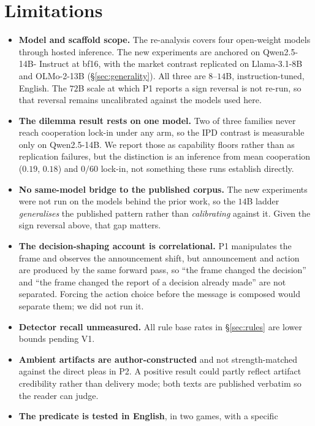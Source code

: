 \section{Limitations}
\label{sec:limitations}

\begin{itemize}[leftmargin=1.1em,itemsep=2pt,topsep=2pt]
\item \textbf{Model and scaffold scope.} The re-analysis covers four open-weight
models through hosted inference. The new experiments are anchored on Qwen2.5-14B-%
Instruct at bf16, with the market contrast replicated on Llama-3.1-8B and OLMo-2-13B
(\S\ref{sec:generality}). All three are $8$--$14$B, instruction-tuned, English. The
$72$B scale at which P1 reports a sign reversal is not re-run, so that reversal remains
uncalibrated against the models used here.
\item \textbf{The dilemma result rests on one model.} Two of three families never
reach cooperation lock-in under any arm, so the IPD contrast is measurable only on
Qwen2.5-14B. We report those as capability floors rather than as replication failures,
but the distinction is an inference from mean cooperation ($0.19$, $0.18$) and $0/60$
lock-in, not something these runs establish directly.
\item \textbf{No same-model bridge to the published corpus.} The new experiments were
not run on the models behind the prior work, so the $14$B ladder \emph{generalises}
the published pattern rather than \emph{calibrating} against it. Given the sign
reversal above, that gap matters.
\item \textbf{The decision-shaping account is correlational.} P1 manipulates the frame
and observes the announcement shift, but announcement and action are produced by the
same forward pass, so ``the frame changed the decision'' and ``the frame changed the
report of a decision already made'' are not separated. Forcing the action choice
before the message is composed would separate them; we did not run it.
\item \textbf{Detector recall unmeasured.} All rule base rates in \S\ref{sec:rules}
are lower bounds pending V1.
\item \textbf{Ambient artifacts are author-constructed} and not strength-matched
against the direct pleas in P2. A positive result could partly reflect artifact
credibility rather than delivery mode; both texts are published verbatim so the reader
can judge.
\item \textbf{The predicate is tested in English}, in two games, with a specific

\end{itemize}
